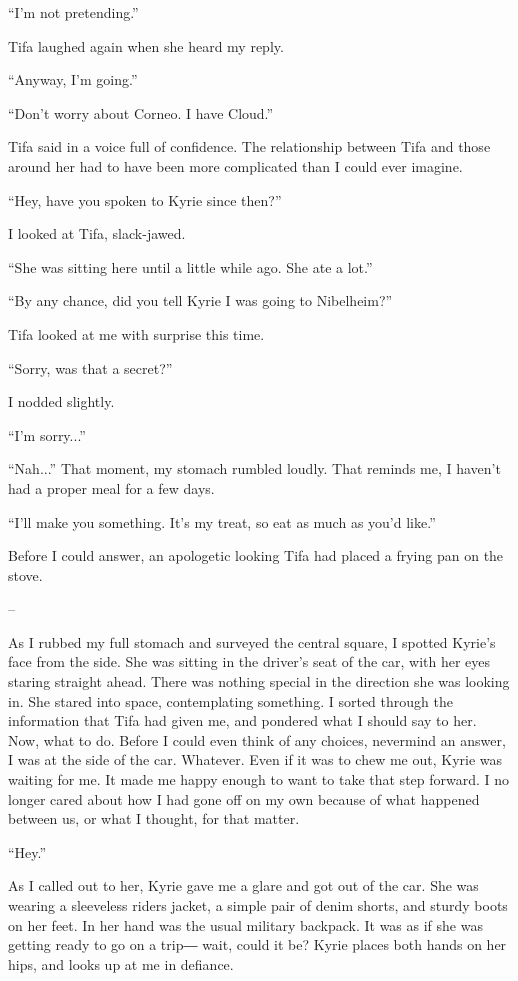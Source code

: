 \documentclass[oneside]{book}
\begin{document}
“I’m not pretending.”

Tifa laughed again when she heard my reply.

“Anyway, I’m going.”

“Don’t worry about Corneo. I have Cloud.”

Tifa said in a voice full of confidence. The relationship between Tifa and those around her had to have been more complicated than I could ever imagine.

“Hey, have you spoken to Kyrie since then?”

I looked at Tifa, slack-jawed.

“She was sitting here until a little while ago. She ate a lot.”

“By any chance, did you tell Kyrie I was going to Nibelheim?”

Tifa looked at me with surprise this time.

“Sorry, was that a secret?”

I nodded slightly.

“I’m sorry...”

“Nah...” That moment, my stomach rumbled loudly. That reminds me, I haven’t had a proper meal for a few days.

“I’ll make you something. It’s my treat, so eat as much as you’d like.”

Before I could answer, an apologetic looking Tifa had placed a frying pan on the stove.

–

As I rubbed my full stomach and surveyed the central square, I spotted Kyrie’s face from the side. She was sitting in the driver’s seat of the car, with her eyes staring straight ahead. There was nothing special in the direction she was looking in. She stared into space, contemplating something. I sorted through the information that Tifa had given me, and pondered what I should say to her. Now, what to do. Before I could even think of any choices, nevermind an answer, I was at the side of the car. Whatever. Even if it was to chew me out, Kyrie was waiting for me. It made me happy enough to want to take that step forward. I no longer cared about how I had gone off on my own because of what happened between us, or what I thought, for that matter.

“Hey.”

As I called out to her, Kyrie gave me a glare and got out of the car. She was wearing a sleeveless riders jacket, a simple pair of denim shorts, and sturdy boots on her feet. In her hand was the usual military backpack. It was as if she was getting ready to go on a trip― wait, could it be? Kyrie places both hands on her hips, and looks up at me in defiance.
\end{document}
